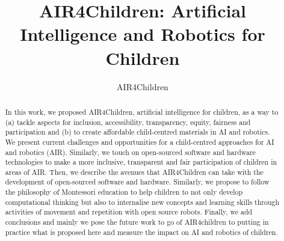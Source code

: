 \documentclass[sigconf]{acmart}
\begin{document}
\title{AIR4Children: Artificial Intelligence and Robotics for Children}


\author{AIR4Children}


\renewcommand{\shortauthors}{AIR4Children}

\begin{abstract}
In this work, we proposed AIR4Children, artificial intelligence for children, as a way to (a) tackle aspects for inclusion, accessibility, transparency, equity, fairness and participation and (b) to create affordable child-centred materials in AI and robotics.
We present current challenges and opportunities for a child-centred approaches for AI and robotics (AIR). 
Similarly, we touch on open-sourced software and hardware technologies to make a more inclusive, transparent and fair participation of children in areas of AIR. 
Then, we describe the avenues that AIR4Children can take with the development of open-sourced software and hardware.
Similarly, we propose to follow the philosophy of Montessori education 
to help children to not only develop computational thinking but also to internalise new concepts and learning skills through activities of movement and repetition with open source robots.
Finally, we add conclusions and mainly we pose the future work to go of AIR4children to putting in practice what is proposed here and measure the impact on AI and robotics of children. 
\end{abstract}
\end{document}
